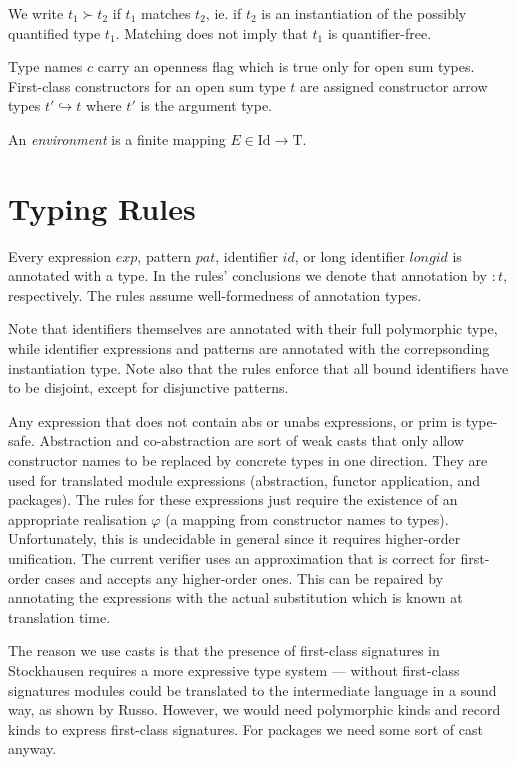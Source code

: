 \documentclass[twoside]{article}
\newcommand{\conarrow}{\hookrightarrow}
\newcommand{\x}[1]{\mathit{#1}}
\newcommand{\f}[1]{\mbox{#1}}
\newcommand{\id}{\x{id}}
\newcommand{\longid}{\x{longid}}
\renewcommand{\exp}{\x{exp}}
\newcommand{\pat}{\x{pat}}
\begin{document}
We write $t_1 \succ t_2$ if $t_1$ matches $t_2$, ie. if $t_2$ is an instantiation of the possibly quantified type $t_1$. Matching does not imply that $t_1$ is quantifier-free.

Type names $c$ carry an openness flag which is true only for open sum types. First-class constructors for an open sum type $t$ are assigned constructor arrow types $t' \conarrow t$ where $t'$ is the argument type.

An {\em environment} is a finite mapping $E \in \f{Id}\to\f{T}$.


\section{Typing Rules}
\label{typing}

Every expression $\exp$, pattern $\pat$, identifier $\id$, or long identifier $\longid$ is annotated with a type. In the rules' conclusions we denote that annotation by $:t$, respectively. The rules assume well-formedness of annotation types.

Note that identifiers themselves are annotated with their full polymorphic type, while identifier expressions and patterns are annotated with the correpsonding instantiation type. Note also that the rules enforce that all bound identifiers have to be disjoint, except for disjunctive patterns.

Any expression that does not contain \f{abs} or \f{unabs} expressions, or \f{prim} is type-safe. Abstraction and co-abstraction are sort of weak casts that only allow constructor names to be replaced by concrete types in one direction. They are used for translated module expressions (abstraction, functor application, and packages). The rules for these expressions just require the existence of an appropriate realisation $\varphi$ (a mapping from constructor names to types). Unfortunately, this is undecidable in general since it requires higher-order unification. The current verifier uses an approximation that is correct for first-order cases and accepts any higher-order ones. This can be repaired by annotating the expressions with the actual substitution which is known at translation time.

The reason we use casts is that the presence of first-class signatures in Stockhausen requires a more expressive type system --- without first-class signatures modules could be translated to the intermediate language in a sound way, as shown by Russo. However, we would need polymorphic kinds and record kinds to express first-class signatures. For packages we need some sort of cast anyway.
\end{document}
